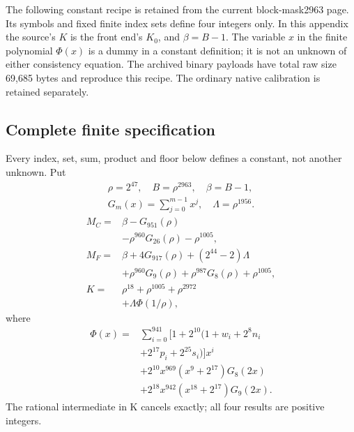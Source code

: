 The following constant recipe is retained from the current block-mask2963 page. Its symbols and fixed finite index sets define four integers only. In this appendix the source's $K$ is the front end's $K_0$, and $\beta=B-1$. The variable $x$ in the finite polynomial $\Phi(x)$ is a dummy in a constant definition; it is not an unknown of either consistency equation. The archived binary payloads have total raw size 69,685 bytes and reproduce this recipe. The ordinary native calibration is retained separately.
\begingroup\small
\newcommand{\fl}[1]{\left\lfloor#1\right\rfloor}
\newcommand{\rg}[2]{\{#1,\ldots,#2\}}
\subsection*{Complete finite specification}
Every index, set, sum, product and floor below defines a constant, not
another unknown. Put
\[
\begin{gathered}
\rho=2^{47},\quad B=\rho^{2963},\quad\beta=B-1,\\
G_m(x)=\sum_{j=0}^{m-1}x^j,\quad
\Lambda=\rho^{1956}.
\end{gathered}
\]
\begin{align*}
M_C={}&\beta-G_{951}(\rho)\\
&-\rho^{960}G_{26}(\rho)-\rho^{1005},\\
M_F={}&\beta+4G_{917}(\rho)+(2^{44}-2)\Lambda\\
&+\rho^{960}G_9(\rho)+\rho^{987}G_8(\rho)
  +\rho^{1005},\\
K={}&\rho^{18}+\rho^{1005}+\rho^{2972}\\
&+\Lambda\Phi(1/\rho),
\end{align*}
where
\[
\begin{split}
\Phi(x)={}&\sum_{i=0}^{941}[1+2^{10}(1+w_i+2^8n_i\\
&+2^{17}p_i+2^{25}s_i)]x^i\\
&+2^{10}x^{969}(x^9+2^{17})G_8(2x)\\
&+2^{18}x^{942}(x^{18}+2^{17})G_9(2x).
\end{split}
\]
The rational intermediate in K cancels exactly; all four results are positive integers.

